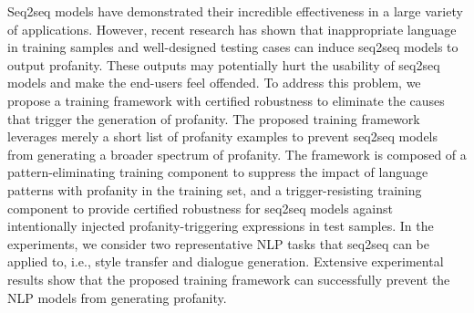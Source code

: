 Seq2seq models have demonstrated their incredible effectiveness in a large variety of applications. However, recent research has shown that inappropriate language in training samples and well-designed testing cases can induce seq2seq models to output profanity. These outputs may potentially hurt the usability of seq2seq models and make the end-users feel offended. To address this problem, we propose a training framework with certified robustness to eliminate the causes that trigger the generation of profanity. The proposed training framework leverages merely a short list of profanity examples to prevent seq2seq models from generating a broader spectrum of profanity. The framework is composed of a pattern-eliminating training component to suppress the impact of language patterns with profanity in the training set, and a trigger-resisting training component to provide certified robustness for seq2seq models against intentionally injected profanity-triggering expressions in test samples. In the experiments, we consider two representative NLP tasks that seq2seq can be applied to, i.e., style transfer and dialogue generation.  Extensive experimental results show that the proposed training framework can successfully prevent the NLP models from generating profanity.
